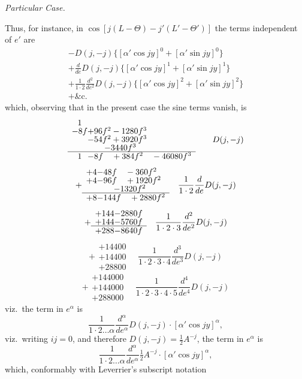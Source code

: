 \documentclass[11pt,a4paper]{article}
\theoremstyle{plain}
\theoremstyle{definition}
\theoremstyle{remark}
\begin{document}
\begin{center}
\textit{Particular Case.}
\end{center}

Thus, for instance, in $\cos[j(L-\Theta)-j'(L'-\Theta')]$ the terms independent of $e'$ are
\begin{multline*}
-D(j,-j)\{[\alpha'\cos jy]^{0}+[\alpha'\sin jy]^{0}\}\\
+\frac{d}{de}D(j,-j)\{[\alpha'\cos jy]^{1}+[\alpha'\sin jy]^{1}\}\\
+\frac{1}{1\cdot2}\frac{d^{2}}{de^{2}}D(j,-j)\{[\alpha'\cos jy]^{2}+[\alpha'\sin jy]^{2}\}\\
+\text{\&c.}
\end{multline*}
which, observing that in the present case the sine terms vanish, is
\[
\begin{array}{r@{}c@{}l}
& 1 & \\[-2pt]
& -8f & +96f^{2} -1280f^{3} \\[-2pt]
& & -54f^{2} +3920f^{3} \\[-2pt]
& & \qquad -3440f^{3} \\[-2pt]
\hline
& 1 & -8f \quad +384f^{2} \quad -46080f^{3}
\end{array}
\qquad D(j,-j)
\]
\[
+\begin{array}{r@{}c@{}l}
& +4 & -48f \quad -360f^{2} \\[-2pt]
& +4 & -96f \quad +1920f^{2} \\[-2pt]
& & \qquad -1320f^{2} \\[-2pt]
\hline
& +8 & -144f \quad +2880f^{2}
\end{array}
\quad\frac{1}{1\cdot2}\frac{d}{de}D(j,-j)
\]
\[
+\begin{array}{r@{}c@{}l}
& +144 & -2880f \\[-2pt]
& +144 & -5760f \\[-2pt]
\hline
& +288 & -8640f
\end{array}
\quad\frac{1}{1\cdot2\cdot3}\frac{d^{2}}{de^{2}}D(j,-j)
\]
\[
+\begin{array}{c}
+14400 \\[2pt]
+14400 \\[-2pt]
\hline
+28800
\end{array}
\quad\frac{1}{1\cdot2\cdot3\cdot4}\frac{d^{3}}{de^{3}}D(j,-j)
\]
\[
+\begin{array}{c}
+144000 \\[2pt]
+144000 \\[-2pt]
\hline
+288000
\end{array}
\quad\frac{1}{1\cdot2\cdot3\cdot4\cdot5}\frac{d^{4}}{de^{4}}D(j,-j)
\]
viz.\ the term in $e^{\alpha}$ is
\[
\frac{1}{1\cdot2\dots\alpha}\frac{d^{\alpha}}{de^{\alpha}}D(j,-j)\cdot[\alpha'\cos jy]^{\alpha},
\]
viz.\ writing $ij=0$, and therefore $D(j,-j)=\tfrac12 A^{-j}$, the term in $e^{\alpha}$ is
\[
\frac{1}{1\cdot2\dots\alpha}\frac{d^{\alpha}}{de^{\alpha}}\tfrac12 A^{-j}\cdot[\alpha'\cos jy]^{\alpha},
\]
which, conformably with Leverrier's subscript notation
\end{document}
